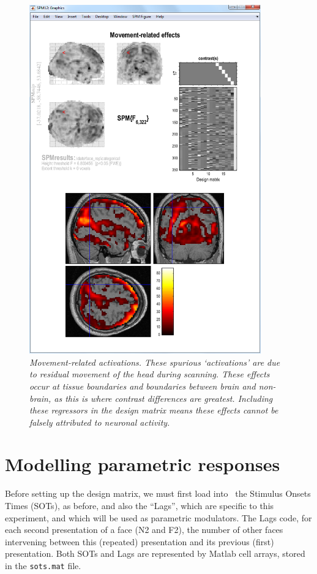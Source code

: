 \begin{figure}
\begin{center}
\includegraphics[width=100mm]{faces/movements}
\caption{\em Movement-related activations. These spurious `activations' are due to residual movement of the head during scanning. These effects occur at tissue boundaries and boundaries between brain and non-brain, as this is where contrast differences are greatest. Including these regressors in the design matrix means these effects cannot be falsely attributed 
to neuronal activity. \label{movements} }
\end{center}
\end{figure}

\section{Modelling parametric responses}

Before setting up the design matrix, we must first load into \matlab\ the Stimulus Onsets Times (SOTs), as before, and also the ``Lags'', which are specific to this experiment, and which will be used as parametric modulators. The Lags code, for each second presentation of a face (N2 and F2), the number of other faces intervening between this (repeated) presentation and its previous (first) presentation. Both SOTs and Lags are represented by Matlab cell arrays, stored in the \texttt{sots.mat} file.

